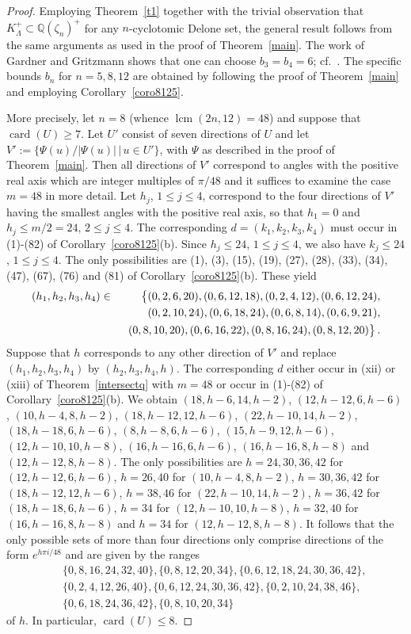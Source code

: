 \documentclass[a4paper]{amsart}
\theoremstyle{definition}
\numberwithin{equation}{section}
\numberwithin{theorem}{section}
\begin{document}
\begin{proof}
Employing Theorem~\ref{t1} together with the trivial observation that
$K_{\varLambda}^+\subset{\mathbb{Q}}(\zeta_n)^+$ for any
$n$-cyclotomic Delone set, the general result follows from the same
arguments as used in the proof of Theorem~\ref{main}. The work of
Gardner and Gritzmann shows that one can choose $b_3=b_4=6$; cf.~\cite[Thm.~ 4.5]{GG}. The specific
bounds $b_n$ for $n=5,8,12$ are obtained by following the proof of
Theorem~\ref{main} and employing Corollary~\ref{coro8125}.

More precisely, let $n=8$ (whence $\operatorname{lcm}(2n,12)=48$) and suppose that $\operatorname{card}(U)\geq 7$. Let
$U'$ consist of seven directions of $U$ and let $V':= \{
\Psi(u)/| \Psi(u)|\, |\, u\in U' \}$, with $\Psi$ as described in the
proof of Theorem~\ref{main}. Then all
directions of $V'$ correspond to angles with the positive
real axis which are integer multiples of $\pi/48$ and it suffices to examine the case $m=48$ in more detail. Let $h_j$,
$1\leq j\leq 4$, correspond to the four directions of $V'$ having the
smallest angles with the positive real axis, so that $h_1=0$ and
$h_j\leq m/2=24$, $2\leq j\leq 4$. The corresponding $d=(k_1,k_2,k_3,k_4)$ must occur in (1)-(82) of
Corollary~\ref{coro8125}(b). Since $h_j\leq 24$, $1\leq j\leq 4$, we
also have $k_j\leq 24$, $1\leq j\leq 4$. The only possibilities are (1), (3), (15), (19), (27), (28), (33), (34),
(47), (67), (76) and (81) of
Corollary~\ref{coro8125}(b). These yield
\begin{eqnarray*}
(h_1,h_2,h_3,h_4)&\in&\big\{(0,2,6,20), (0,6,12,18), (0,2,4,12),
(0,6,12,24),\\&& \hphantom{\big\{} (0,2,10,24),(0,6,18,24), (0,6,8,14),
(0,6,9,21), \\&& \hphantom{\big\{}(0,8,10,20), (0,6,16,22), (0,8,16,24), (0,8,12,20)\big\}\,.
\end{eqnarray*}
Suppose that $h$ corresponds to any other direction of $V'$ and replace $(h_1,h_2,h_3,h_4)$ by
$(h_2,h_3,h_4,h)$. The corresponding $d$ either occur in (xii) or (xiii) of
Theorem~\ref{intersectq} with $m=48$ or occur in (1)-(82) of
Corollary~\ref{coro8125}(b).  We obtain $(18,h-6,14,h-2)$, $(12,h-12,6,h-6)$,
$(10,h-4,8,h-2)$, $(18,h-12,12,h-6)$, $(22,h-10,14,h-2)$,
$(18,h-18,6,h-6)$, $(8,h-8,6,h-6)$, $(15,h-9,12,h-6)$,
$(12,h-10,10,h-8)$, $(16,h-16,6,h-6)$, $(16,h-16,8,h-8)$ and
$(12,h-12,8,h-8)$. The only possibilities are $h=24,30,36,42$ for $(12,h-12,6,h-6)$, $h=26,40$ for $(10,h-4,8,h-2)$,
$h=30,36,42$ for $(18,h-12,12,h-6)$, $h=38,46$ for $(22,h-10,14,h-2)$,
$h=36,42$ for $(18,h-18,6,h-6)$, $h=34$ for $(12,h-10,10,h-8)$,
$h=32,40$ for $(16,h-16,8,h-8)$ and $h=34$ for $(12,h-12,8,h-8)$. It
follows that the only possible sets of more than four directions only comprise
directions of the form $e^{h\pi i/48}$ and 
are given by  the ranges 
\begin{eqnarray*}&&\{0,8,16,24,32,40\},
 \{0,8,12,20,34\},
\{0,6,12,18,24,30,36,42\},\\&& \{0,2,4,12,26,40\},
\{0,6,12,24,30,36,42\}, \{0,2,10,24,38,46\},\\&& \{0,6,18,24,36,42\}, \{0,8,10,20,34\} 
\end{eqnarray*}
of $h$. In particular, $\operatorname{card}(U)\leq 8$.  


\end{proof}
\end{document}
